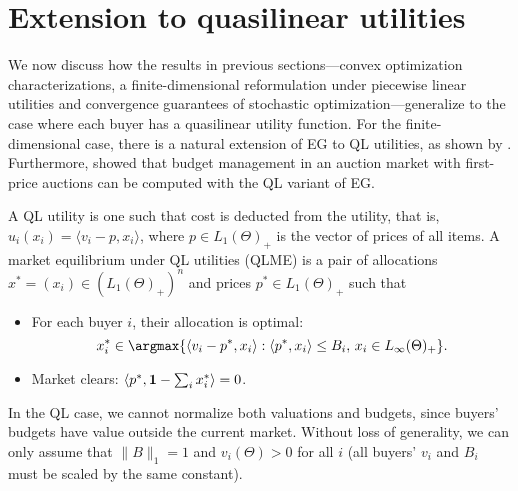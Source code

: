 \section{Extension to quasilinear utilities} \label{sec:ql}
We now discuss how the results in previous sections---convex optimization characterizations, a finite-dimensional reformulation under piecewise linear utilities and convergence guarantees of stochastic optimization---generalize to the case where each buyer has a quasilinear utility function. 
For the finite-dimensional case, there is a natural extension of EG to QL utilities, as shown by \citet{chen2007note,cole2017convex}. 
Furthermore, \citet{conitzer2019pacing} showed that budget management in an auction market with first-price auctions can be computed with the QL variant of EG. 

A QL utility is one such that cost is deducted from the utility, that is, $u_i(x_i) = \langle v_i - p, x_i \rangle$, where $p\in L_1(\Theta)_+$ is the vector of prices of all items. 
A market equilibrium under QL utilities (QLME) is a pair of allocations $x^* = (x_i)\in (L_1(\Theta)_+)^n$ and prices $p^*\in L_1(\Theta)_+$ such that
\begin{itemize}
    \item For each buyer $i$, their allocation is optimal: 
        \[ x^*_i \in \argmax \{ \langle v_i - p^*, x_i \rangle: \langle p^*, x_i\rangle \leq B_i,\, x_i \in L_\infty(\Theta)_+\}. \]
    \item Market clears: $\langle p^*,  \mathbf{1} - \sum_i x^*_i \rangle = 0$.
\end{itemize}
In the QL case, we cannot normalize both valuations and budgets, since buyers' budgets have value outside the current market. %
Without loss of generality, we can only assume that $\|B\|_1 = 1$ and $v_i(\Theta) >0$ for all $i$ (all buyers' $v_i$ and $B_i$ must be scaled by the same constant).

